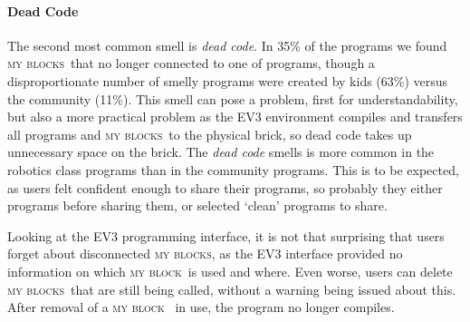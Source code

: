 \documentclass[conference]{IEEEtran}
\newcommand{\mbs}{\textsc{my blocks}}
\newcommand{\mb}{\textsc{my block}}
\begin{document}
\paragraph{Dead Code}
The second most common smell is \emph{dead code}. In 35\% of the programs we found \mbs~that no longer connected to one of programs, though a disproportionate number of smelly programs were created by kids (63\%) versus the community (11\%). This smell can pose a problem, first for understandability, but also  a more practical problem as the EV3 environment compiles and transfers all programs and \mbs~to the physical brick, so dead code takes up unnecessary space on the brick. The \emph{dead code} smells is more common in the robotics class programs than in the community programs. This is to be expected, as users felt confident enough to share their programs, so probably they either programs before sharing them, or selected `clean' programs to share.

Looking at the EV3 programming interface, it is not that surprising that users forget about disconnected \mbs, as the EV3 interface provided no information on which \mb~is used and where. Even worse, users can delete \mbs~that are still being called, without a warning being issued about this. After removal of a \mb~ in use, the program no longer compiles.


%
%
%
\end{document}
